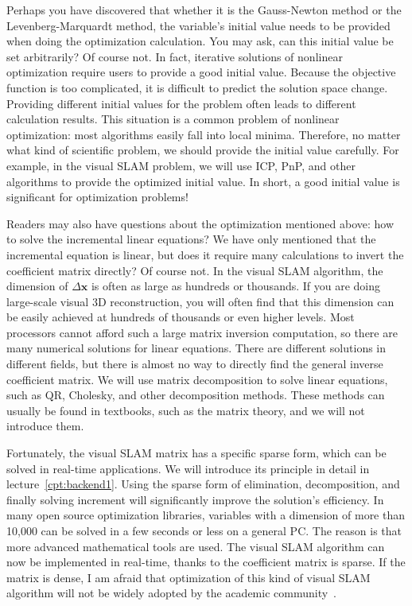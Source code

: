 Perhaps you have discovered that whether it is the Gauss-Newton method or the Levenberg-Marquardt method, the variable's initial value needs to be provided when doing the optimization calculation. You may ask, can this initial value be set arbitrarily? Of course not. In fact, iterative solutions of nonlinear optimization require users to provide a good initial value. Because the objective function is too complicated, it is difficult to predict the solution space change. Providing different initial values for the problem often leads to different calculation results. This situation is a common problem of nonlinear optimization: most algorithms easily fall into local minima. Therefore, no matter what kind of scientific problem, we should provide the initial value carefully. For example, in the visual SLAM problem, we will use ICP, PnP, and other algorithms to provide the optimized initial value. In short, a good initial value is significant for optimization problems!

Readers may also have questions about the optimization mentioned above: how to solve the incremental linear equations? We have only mentioned that the incremental equation is linear, but does it require many calculations to invert the coefficient matrix directly? Of course not. In the visual SLAM algorithm, the dimension of $\Delta \mathbf{x}$ is often as large as hundreds or thousands. If you are doing large-scale visual 3D reconstruction, you will often find that this dimension can be easily achieved at hundreds of thousands or even higher levels. Most processors cannot afford such a large matrix inversion computation, so there are many numerical solutions for linear equations. There are different solutions in different fields, but there is almost no way to directly find the general inverse coefficient matrix. We will use matrix decomposition to solve linear equations, such as QR, Cholesky, and other decomposition methods. These methods can usually be found in textbooks, such as the matrix theory, and we will not introduce them.

Fortunately, the visual SLAM matrix has a specific sparse form, which can be solved in real-time applications. We will introduce its principle in detail in lecture~\ref{cpt:backend1}. Using the sparse form of elimination, decomposition, and finally solving increment will significantly improve the solution's efficiency. In many open source optimization libraries, variables with a dimension of more than 10,000 can be solved in a few seconds or less on a general PC. The reason is that more advanced mathematical tools are used. The visual SLAM algorithm can now be implemented in real-time, thanks to the coefficient matrix is sparse. If the matrix is dense, I am afraid that optimization of this kind of visual SLAM algorithm will not be widely adopted by the academic community~\cite{Lourakis2009, Sibley2009a, Triggs2000}.

